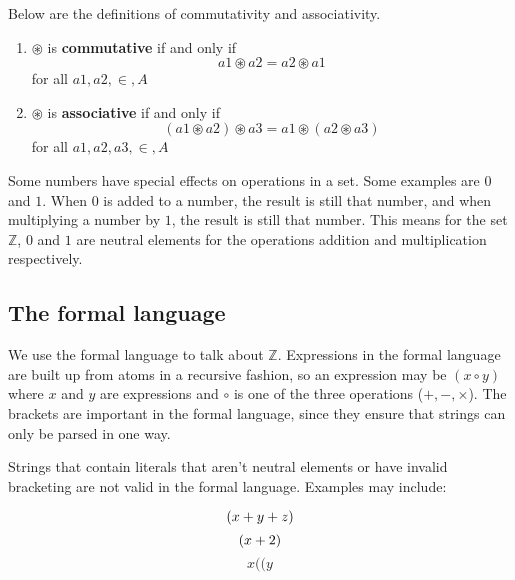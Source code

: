 \documentclass{article}
\begin{document}
Below are the definitions of commutativity and associativity.


\begin{enumerate}
  \item 
    $\circledast$ is {\bf commutative} if and only if
    \[
	a1 \circledast a2 = a2 \circledast a1
    \] 
    for all $a1,a2,\in,A$
  \item 
    $\circledast$ is {\bf associative} if and only if
    \[
	(a1 \circledast a2) \circledast a3 = a1 \circledast (a2 \circledast a3)
    \] 
    for all $a1,a2,a3,\in,A$
\end{enumerate}

Some numbers have special effects on operations in a set. Some examples are $0$ and $1$. When $0$ is added to a number, the result is still that number, and when multiplying a number by $1$, the result is still that number. This means for the set $\mathbb{Z}$, $0$ and $1$ are neutral elements for the operations addition and multiplication respectively.

\subsection{The formal language}

We use the formal language to talk about $\mathbb{Z}$. Expressions in the formal language are built up from atoms in a recursive fashion, so an expression may be $(x \circ y)$ where $x$ and $y$ are expressions and $\circ$ is one of the three operations ($+, -, \times$). The brackets are important in the formal language, since they ensure that strings can only be parsed in one way.

Strings that contain literals that aren't neutral elements or have invalid bracketing are not valid in the formal language. Examples may include:

\[
	(x + y + z)\\
\]
\[
	(x + 2)\\
\]
\[
	x((y
\]


\end{document}

